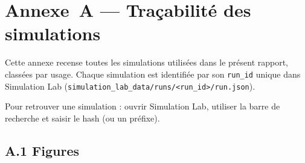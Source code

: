 
\section*{Annexe~A — Traçabilité des simulations}

Cette annexe recense toutes les simulations utilisées dans le présent rapport,
classées par usage. Chaque simulation est identifiée par son \texttt{run\_id}
unique dans Simulation Lab (\texttt{simulation\_lab\_data/runs/<run\_id>/run.json}).

Pour retrouver une simulation : ouvrir Simulation Lab, utiliser la barre de
recherche et saisir le hash (ou un préfixe).

\subsection*{A.1 Figures}

